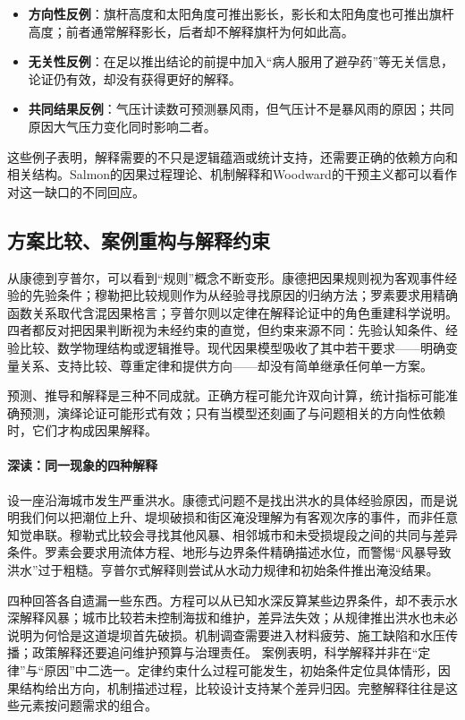 \begin{itemize}
  \item \textbf{方向性反例}：旗杆高度和太阳角度可推出影长，影长和太阳角度也可推出旗杆高度；前者通常解释影长，后者却不解释旗杆为何如此高。
  \item \textbf{无关性反例}：在足以推出结论的前提中加入“病人服用了避孕药”等无关信息，论证仍有效，却没有获得更好的解释。
  \item \textbf{共同结果反例}：气压计读数可预测暴风雨，但气压计不是暴风雨的原因；共同原因大气压力变化同时影响二者。
\end{itemize}

这些例子表明，解释需要的不只是逻辑蕴涵或统计支持，还需要正确的依赖方向和相关结构。Salmon的因果过程理论、机制解释和Woodward的干预主义都可以看作对这一缺口的不同回应。

\subsection{方案比较、案例重构与解释约束}

从康德到亨普尔，可以看到“规则”概念不断变形。康德把因果规则视为客观事件经验的先验条件；穆勒把比较规则作为从经验寻找原因的归纳方法；罗素要求用精确函数关系取代含混因果格言；亨普尔则以定律在解释论证中的角色重建科学说明。
四者都反对把因果判断视为未经约束的直觉，但约束来源不同：先验认知条件、经验比较、数学物理结构或逻辑推导。现代因果模型吸收了其中若干要求------明确变量关系、支持比较、尊重定律和提供方向------却没有简单继承任何单一方案。

\begin{keypoint}
预测、推导和解释是三种不同成就。正确方程可能允许双向计算，统计指标可能准确预测，演绎论证可能形式有效；只有当模型还刻画了与问题相关的方向性依赖时，它们才构成因果解释。
\end{keypoint}

\paragraph{深读：同一现象的四种解释}

设一座沿海城市发生严重洪水。康德式问题不是找出洪水的具体经验原因，而是说明我们何以把潮位上升、堤坝破损和街区淹没理解为有客观次序的事件，而非任意知觉串联。穆勒式比较会寻找其他风暴、相邻城市和未受损堤段之间的共同与差异条件。罗素会要求用流体方程、地形与边界条件精确描述水位，而警惕“风暴导致洪水”过于粗糙。亨普尔式解释则尝试从水动力规律和初始条件推出淹没结果。

四种回答各自遗漏一些东西。方程可以从已知水深反算某些边界条件，却不表示水深解释风暴；城市比较若未控制海拔和维护，差异法失效；从规律推出洪水也未必说明为何恰是这道堤坝首先破损。机制调查需要进入材料疲劳、施工缺陷和水压传播；政策解释还要追问维护预算与治理责任。
案例表明，科学解释并非在“定律”与“原因”中二选一。定律约束什么过程可能发生，初始条件定位具体情形，因果结构给出方向，机制描述过程，比较设计支持某个差异归因。完整解释往往是这些元素按问题需求的组合。

